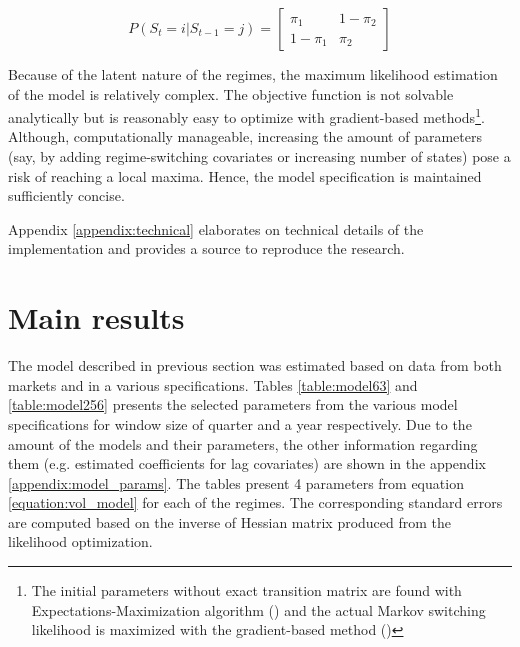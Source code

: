 \documentclass[12pt]{article}
\begin{document}
\begin{equation}
	P(S_t = i | S_{t-1} = j) = \begin{bmatrix}
		\pi_1 & 1 - \pi_2\\
		1 - \pi_1 & \pi_2
	\end{bmatrix}
\end{equation}

Because of the latent nature of the regimes, the maximum likelihood estimation of the model is relatively complex. The objective function is not solvable analytically but is reasonably easy to optimize with gradient-based methods\footnote{The initial parameters without exact transition matrix are found with Expectations-Maximization algorithm (\citet{dempster77}) and the actual Markov switching likelihood is maximized with the gradient-based method (\citet{rowan90})}. Although, computationally manageable, increasing the amount of parameters (say, by adding regime-switching covariates or increasing number of states) pose a risk of reaching a local maxima. Hence, the model specification is maintained sufficiently concise.

Appendix \ref{appendix:technical} elaborates on technical details of the implementation and provides a source to reproduce the research.

\section{Main results}\label{section:main_results}

The model described in previous section was estimated based on data from both markets and in a various specifications. Tables \ref{table:model63} and \ref{table:model256} presents the selected parameters from the various model specifications for window size of quarter and a year respectively. Due to the amount of the models and their parameters, the other information regarding them (e.g. estimated coefficients for lag covariates) are shown in the appendix \ref{appendix:model_params}. The tables present 4 parameters from equation \ref{equation:vol_model} for each of the regimes. The corresponding standard errors are computed based on the inverse of Hessian matrix produced from the likelihood optimization. 
\end{document}

